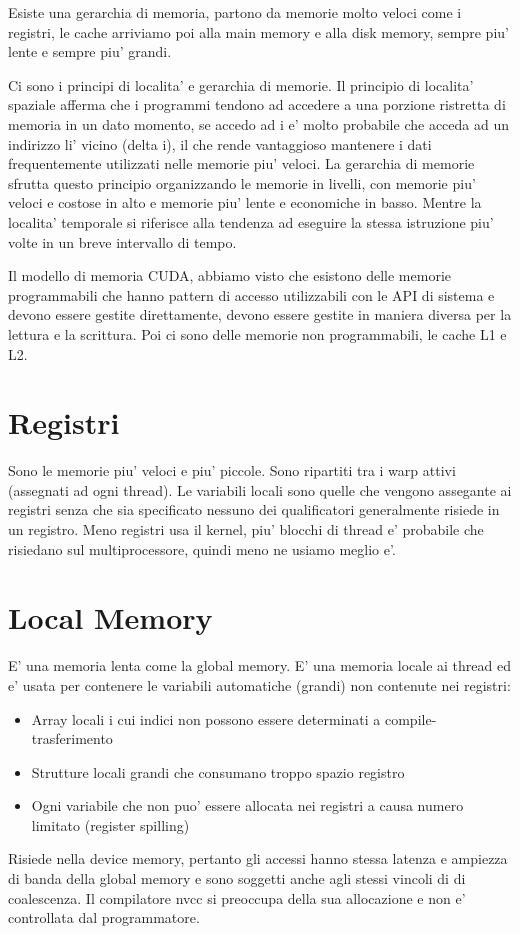 Esiste una gerarchia di memoria, partono da memorie molto veloci come i registri, le cache arriviamo poi alla main memory e alla disk memory, sempre piu' lente e sempre piu' grandi.

Ci sono i principi di localita' e gerarchia di memorie. Il principio di localita' spaziale afferma che i programmi tendono ad accedere a una porzione ristretta di memoria in un dato momento, se accedo ad i e' molto probabile che acceda ad un indirizzo li' vicino (delta i), il che rende vantaggioso mantenere i dati frequentemente utilizzati nelle memorie piu' veloci. La gerarchia di memorie sfrutta questo principio organizzando le memorie in livelli, con memorie piu' veloci e costose in alto e memorie piu' lente e economiche in basso.
Mentre la localita' temporale si riferisce alla tendenza ad eseguire la stessa istruzione piu' volte in un breve intervallo di tempo.

Il modello di memoria CUDA, abbiamo visto che esistono delle memorie programmabili che hanno pattern di accesso utilizzabili con le API di sistema e devono essere gestite direttamente, devono essere gestite in maniera diversa per la lettura e la scrittura. Poi ci sono delle memorie non programmabili, le cache L1 e L2.

\section{Registri}
Sono le memorie piu' veloci e piu' piccole. Sono ripartiti tra i warp attivi (assegnati ad ogni thread). Le variabili locali sono quelle che vengono assegante ai registri senza che sia specificato nessuno dei qualificatori generalmente risiede in un registro.
Meno registri usa il kernel, piu' blocchi di thread e' probabile che risiedano sul multiprocessore, quindi meno ne usiamo meglio e'.

\section{Local Memory}
E' una memoria lenta come la global memory. E' una memoria locale ai thread ed e' usata per contenere le variabili automatiche (grandi) non contenute nei registri:
\begin{itemize}
    \item Array locali i cui indici non possono essere determinati a compile-trasferimento
    \item Strutture locali grandi che consumano troppo spazio registro
    \item Ogni variabile che non puo' essere allocata nei registri a causa numero limitato (register spilling)
\end{itemize}
Risiede nella device memory, pertanto gli accessi hanno stessa latenza e ampiezza di banda della global memory e sono soggetti anche agli stessi vincoli di di coalescenza.
Il compilatore nvcc si preoccupa della sua allocazione e non e' controllata dal programmatore.

